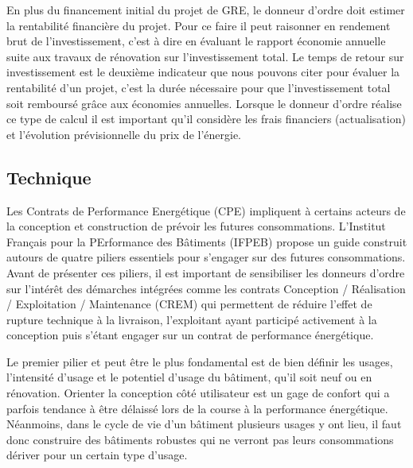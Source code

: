 En plus du financement initial du projet de GRE, le donneur d'ordre doit estimer la rentabilité financière du projet. Pour ce faire il peut raisonner en rendement brut de l'investissement, c'est à dire en évaluant le rapport économie annuelle suite aux travaux de rénovation sur l'investissement total. Le temps de retour sur investissement est le deuxième indicateur que nous pouvons citer pour évaluer la rentabilité d'un projet, c'est la durée nécessaire pour que l'investissement total soit remboursé grâce aux économies annuelles. Lorsque le donneur d'ordre réalise ce type de calcul il est important qu'il considère les frais financiers (actualisation) et l'évolution prévisionnelle du prix de l'énergie.

\subsection{Technique}
\label{Engagement performantiel - Technique}

Les Contrats de Performance Energétique (CPE) impliquent à certains acteurs de la conception et construction de prévoir les futures consommations. L'Institut Français pour la PErformance des Bâtiments (IFPEB) \cite{IFPEB-2014} propose un guide construit autours de quatre piliers essentiels pour s'engager sur des futures consommations. Avant de présenter ces piliers, il est important de sensibiliser les donneurs d'ordre sur l'intérêt des démarches intégrées comme les contrats Conception / Réalisation / Exploitation / Maintenance (CREM) qui permettent de réduire l'effet de rupture technique à la livraison, l'exploitant ayant participé activement à la conception puis s'étant engager sur un contrat de performance énergétique.

Le premier pilier et peut être le plus fondamental est de bien définir les usages, l'intensité d'usage et le potentiel d'usage du bâtiment, qu'il soit neuf ou en rénovation. Orienter la conception côté utilisateur est un gage de confort qui a parfois tendance à être délaissé lors de la course à la performance énergétique. Néanmoins, dans le cycle de vie d'un bâtiment plusieurs usages y ont lieu, il faut donc construire des bâtiments robustes qui ne verront pas leurs consommations dériver pour un certain type d'usage.

